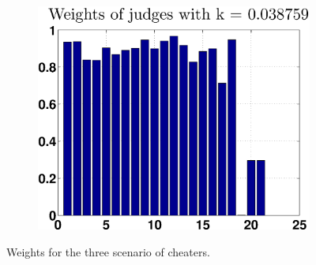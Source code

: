 \documentclass[12pt,a4paper]{article}
\begin{document}
\begin{figure}[!ht]
\begin{subfigure}[b]{0.32\textwidth}
\end{subfigure}
\begin{subfigure}[b]{0.32\textwidth}
\includegraphics[width = \textwidth]{cheaters/chweightsMix.eps}
\end{subfigure}
\caption{Weights for the three scenario of cheaters\label{weightch}.}
\end{figure}
\end{document}
